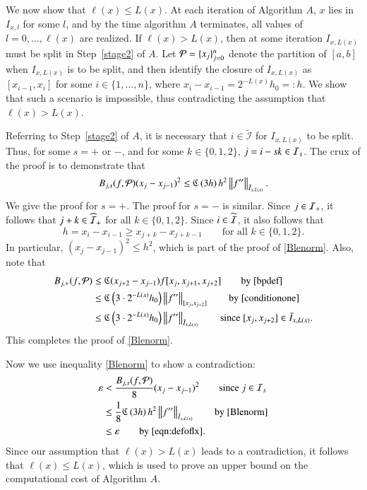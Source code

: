 \documentclass[review]{elsarticle}
\newcommand{\abstol}{\varepsilon}
\theoremstyle{definition}
\newcommand{\Ixl}{I_{x,l}}
\begin{document}
We now show that $\ell(x) \le L(x)$.  At each iteration of Algorithm $A$, $x$ lies in $\Ixl$ for some $l$, and by the time algorithm $A$ terminates, all values of $l = 0, \ldots, \ell(x)$ are realized.  If $\ell(x) > L(x)$, then at some iteration $I_{x,L(x)}$ must be split in Step~\ref{stage2} of $A$.  Let $\cp = \{x_j\}_{j=0}^n$ denote the partition of $[a,b]$ when $I_{x,L(x)}$ is to be split, and then identify the closure of $I_{x,L(x)}$ as $[x_{i-1},x_i]$ for some $i \in \{1, \ldots, n\}$, where $x_i-x_{i-1}=2^{-L(x)}h_0 = : h$.
We show that such a scenario is impossible, thus contradicting the assumption that $\ell(x) > L(x)$.

Referring to Step~\ref{stage2} of $A$, it is necessary that $i \in \widetilde{\mathcal{I}}$ for $I_{x,L(x)}$ to be split.  Thus, for some $s =+$ or $-$, and for some $k \in \{0,1,2\}$, $j = i  - sk \in \ci_s$.   The crux of the proof is to demonstrate that
\begin{equation} \label{Blenorm}
B_{j,s}(f,\cp)(x_j-x_{j-1})^2 \le  \fC\left(3h\right) h^2  \norm[\bar{I}_{x,L(x)}]{f''}.
\end{equation}
We give the proof for  $s =+$.  The proof for $s= -$ is similar.  Since $j \in \ci_+$, it follows that $j + k \in \widehat{\ci}_+$ for all $k \in \{0,1,2\}$. Since $i \in \widetilde{\ci}$, it also follows that
\begin{equation} \label{conditionone}
h = x_{i} - x_{i-1} \ge x_{j+k} - x_{j+k-1} \qquad \text{for all } k \in \{0,1,2\}.
\end{equation}
In particular, $(x_j-x_{j-1})^2 \le h^2$, which is part of the proof of \eqref{Blenorm}.  Also, note that
  \begin{align*}
  B_{j,+}(f,\cp)
  & \le \fC(x_{j+2}-x_{j-1})f[x_{j},x_{j+1},x_{j+2}] \qquad \text{by}~\eqref{bpdef} \\
  &\le  \fC\left(3\cdot2^{-L(x)}h_0\right) \norm[{[x_{j},x_{j+2}]}]{f''} \qquad \text{by}~\eqref{conditionone} \\
  & \le   \fC\left(3\cdot2^{-L(x)}h_0\right)  \norm[\bar{I}_{x,L(x)}]{f''}  \qquad \text{since}~[x_{j},x_{j+2}] \in \bar{I}_{x,L(x)} .
  \end{align*}
This completes the proof of  \eqref{Blenorm}.

Now we use inequality \eqref{Blenorm} to show a contradiction:
 \begin{align*}
 \abstol & <  \frac{B_{j,s}(f,\cp)}{8}(x_j-x_{j-1})^2 \qquad \text{since}~j \in \ci_s\\
 & \le   \frac 1 8 \fC\left(3h\right) h^2  \norm[\bar{I}_{x,L(x)}]{f''}  \qquad \text{by}~\eqref{Blenorm} \\
 & \le    \abstol \qquad \text{by}~\eqref{eqn:defoflx} .
 \end{align*}
 Since our assumption that $\ell(x) > L(x)$ leads to a contradiction, it follows that $\ell(x) \le  L(x)$, which is used to prove an upper bound on the computational cost of Algorithm $A$.
\end{document}
